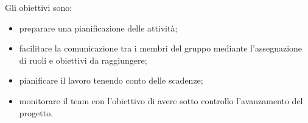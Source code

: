  Gli obiettivi sono:
\begin{itemize}
	\item{preparare una pianificazione delle attività;}
	\item{facilitare la comunicazione tra i membri del gruppo mediante l'assegnazione di ruoli e obiettivi da raggiungere;}
	\item{pianificare il lavoro tenendo conto delle scadenze;}
	\item{monitorare il team con l'obiettivo di avere sotto controllo l'avanzamento del progetto.}
\end{itemize}